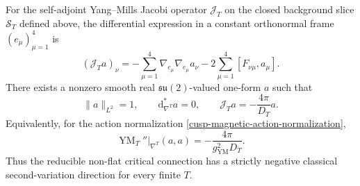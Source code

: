 \begin{theorem}
\label{cusp-magnetic-negative-mode}
For the self-adjoint Yang--Mills Jacobi operator \(\mathcal J_T\) on the
closed background slice \(\mathscr S_T\) defined above, the differential
expression in a constant orthonormal frame \((e_\mu)_{\mu=1}^4\) is
\begin{equation}
 (\mathcal J_Ta)_\nu
 =-\sum_{\mu=1}^4\nabla_{e_\mu}\nabla_{e_\mu}a_\nu
  -2\sum_{\mu=1}^4[F_{\nu\mu},a_\mu].
 \label{cusp-magnetic-jacobi-operator}
\end{equation}
There exists a nonzero smooth real
\(\mathfrak{su}(2)\)-valued one-form \(a\) such that
\begin{equation}
 \lVert a\rVert_{L^2}=1,
 \qquad
 \mathrm d_{\nabla^T}^*a=0,
 \qquad
 \mathcal J_Ta=-\frac{4\pi}{D_T}a.
 \label{cusp-magnetic-negative-eigen-equation}
\end{equation}
Equivalently, for the action normalization
\cref{cusp-magnetic-action-normalization},
\begin{equation}
 \operatorname{YM}_T''\big|_{\nabla^T}(a,a)
 =-\frac{4\pi}{g_{\mathrm{YM}}^2D_T}.
 \label{cusp-magnetic-negative-hessian}
\end{equation}
Thus the reducible non-flat critical connection has a strictly negative
classical second-variation direction for every finite \(T\).
\end{theorem}

